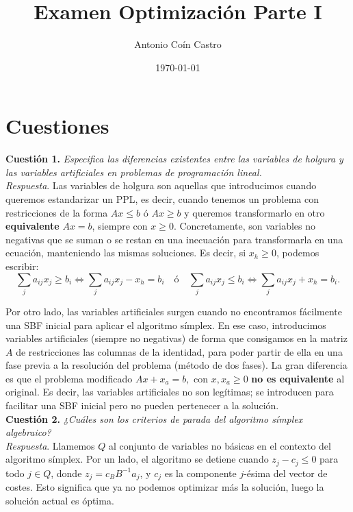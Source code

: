 \documentclass[11pt,a4paper]{article}
\title{Examen Optimización Parte I\\}
\author{Antonio Coín Castro}
\date{\today}
\begin{document}
\maketitle

\section*{Cuestiones}

\textbf{Cuestión 1.} \emph{Especifica las diferencias existentes entre las variables de holgura y las variables artificiales en problemas de programación lineal.}\\

\textit{Respuesta}. Las variables de holgura son aquellas que introducimos cuando queremos estandarizar un PPL, es decir, cuando tenemos un problema con restricciones de la forma $Ax\leq b$ ó $Ax\geq b$ y queremos transformarlo en otro \textbf{equivalente} $Ax = b$, siempre con $x \geq 0$. Concretamente, son variables no negativas que se suman o se restan en una inecuación para transformarla en una ecuación, manteniendo las mismas soluciones. Es decir, si $x_h\geq 0$, podemos escribir:
\[
\sum_j a_{ij}x_j \geq b_i \iff \sum_j a_{ij}x_j - x_{h} = b_i \quad \text{ó} \quad \sum_j a_{ij}x_j \leq b_i \iff \sum_j a_{ij}x_j + x_{h} = b_i.
\]

Por otro lado, las variables artificiales surgen cuando no encontramos fácilmente una SBF inicial para aplicar el algoritmo símplex. En ese caso, introducimos variables artificiales (siempre no negativas) de forma que consigamos en la matriz $A$ de restricciones las columnas de la identidad, para poder partir de ella en una fase previa a la resolución del problema (método de dos fases). La gran diferencia es que el problema modificado $Ax + x_a = b, $ con $x,x_a\geq 0$ \textbf{no es equivalente} al original. Es decir, las variables artificiales no son legítimas; se introducen para facilitar una SBF inicial pero no pueden pertenecer a la solución.\\

\textbf{Cuestión 2.} \emph{¿Cuáles son los criterios de parada del algoritmo símplex algebraico?}\\

\textit{Respuesta}. Llamemos $Q$ al conjunto de variables no básicas en el contexto del algoritmo símplex. Por un lado, el algoritmo se detiene cuando $z_j-c_j\leq 0$ para todo $j\in Q$, donde $z_j=c_BB^{-1}a_j$, y $c_j$ es la componente $j$-ésima del vector de costes. Esto significa que ya no podemos optimizar más la solución, luego la solución actual es óptima.\\
\end{document}
